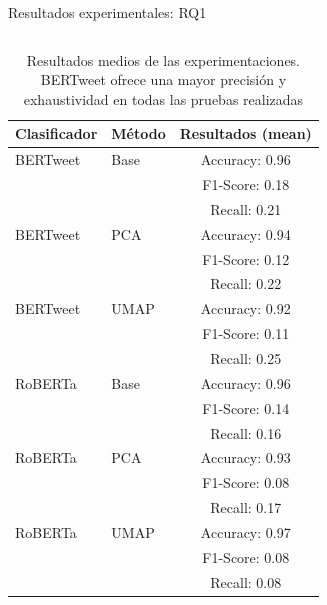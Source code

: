 \documentclass[final]{beamer}
\newlength{\onecolwid}
\newlength{\twocolwid}
\begin{document}
\begin{frame}[t]
\begin{columns}[t]
\begin{column}{\twocolwid}
\begin{columns}[t,totalwidth=\twocolwid]
\begin{column}{\twocolwid}
\begin{block}{Resultados experimentales: RQ1}
\begin{column}{\onecolwid}
\begin{table}[ht]
\begin{tabular}{|l|l|c|}
                \hline
                \textbf{Clasificador} & \textbf{Método} & \textbf{Resultados (mean)} \\ \hline
                BERTweet & Base  & Accuracy: 0.96 \\ 
                         &       & F1-Score: 0.18 \\ 
                         &       & Recall: 0.21 \\ \hline
                BERTweet & PCA   & Accuracy: 0.94 \\ 
                         &       & F1-Score: 0.12 \\ 
                         &       & Recall: 0.22 \\ \hline
                BERTweet & UMAP  & Accuracy: 0.92 \\ 
                         &       & F1-Score: 0.11 \\ 
                         &       & Recall: 0.25 \\ \hline
                RoBERTa  & Base  & Accuracy: 0.96 \\ 
                         &       & F1-Score: 0.14 \\ 
                         &       & Recall: 0.16 \\ \hline
                RoBERTa  & PCA   & Accuracy: 0.93 \\ 
                         &       & F1-Score: 0.08 \\ 
                         &       & Recall: 0.17 \\ \hline
                RoBERTa  & UMAP  & Accuracy: 0.97 \\ 
                         &       & F1-Score: 0.08 \\ 
                         &       & Recall: 0.08 \\ \hline
                \end{tabular}
                \caption{Resultados medios de las experimentaciones. BERTweet ofrece una mayor precisión y exhaustividad en todas las pruebas realizadas}
                \label{tab:summary}
            \end{table}
                \end{column} %
                
            \end{block}
            \end{column}
        \end{columns} %
\end{column} %




\end{columns}
\end{frame}
\end{document}
